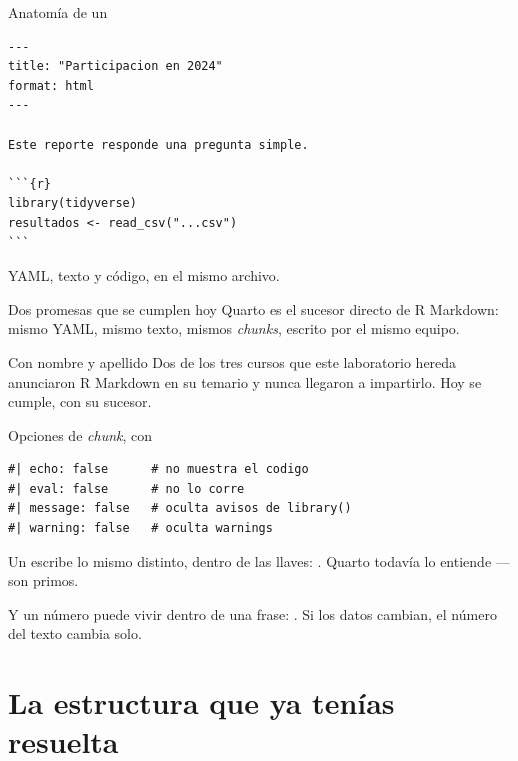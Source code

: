 \begin{frame}[fragile]{Anatomía de un }
\begin{lstlisting}
---
title: "Participacion en 2024"
format: html
---

Este reporte responde una pregunta simple.

```{r}
library(tidyverse)
resultados <- read_csv("...csv")
```
\end{lstlisting}

  \vspace{0.3em}
  {\small YAML, texto y código, en el mismo archivo.}
\end{frame}

\begin{frame}{Dos promesas que se cumplen hoy}
  \vspace{0.3em}
  Quarto es el sucesor directo de \ac{R Markdown}: mismo YAML, mismo texto,
  mismos \textit{chunks}, escrito por el mismo equipo.

  \vspace{1.0em}
  \begin{block}{Con nombre y apellido}
    Dos de los tres cursos que este laboratorio hereda anunciaron R Markdown
    en su temario y nunca llegaron a impartirlo. Hoy se cumple, con su
    sucesor.
  \end{block}
\end{frame}

\begin{frame}[fragile]{Opciones de \textit{chunk}, con \cod{\#|}}
\begin{lstlisting}
#| echo: false      # no muestra el codigo
#| eval: false      # no lo corre
#| message: false   # oculta avisos de library()
#| warning: false   # oculta warnings
\end{lstlisting}

  \vspace{0.7em}
  Un  escribe lo mismo distinto, dentro de las llaves:
  . Quarto todavía lo entiende — son primos.

  \vspace{0.8em}
  Y un número puede vivir \ac{dentro} de una frase:
  . Si los datos cambian, el número del texto cambia
  solo.
\end{frame}

\section{La estructura que ya tenías resuelta}

